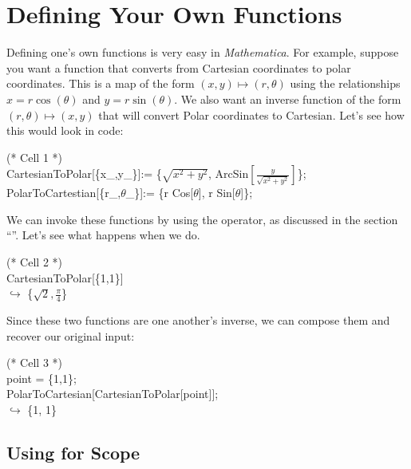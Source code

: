 \chapter{Defining Your Own Functions}
\label{chap:Functions}

Defining one's own functions is very easy in \emph{Mathematica}. For example, suppose you want a function that converts from Cartesian coordinates to polar coordinates. This is a map of the form $(x,y) \mapsto (r, \theta)$ using the relationships $x = r\cos(\theta)$ and $y = r\sin(\theta)$. We also want an inverse function of the form $(r, \theta) \mapsto (x,y)$ that will convert Polar coordinates to Cartesian. Let's see how this would look in code:

\begin{code}
	   (* Cell 1 *)\\
	   CartesianToPolar[\{x\_,y\_\}]:= \{$\sqrt{x^2 + y^2}$, ArcSin$\left[\frac{y}{\sqrt{x^2 + y^2}}\right]$\};\\
	   PolarToCartestian[\{r\_,$\theta$\_\}]:= \{r Cos[$\theta$], r Sin[$\theta$]\};\\
\end{code}

We can invoke these functions by using the \expr{[]} operator, as discussed in the section ``''. Let's see what happens when we do. 

\begin{code}
	   (* Cell 2 *)\\
	   CartesianToPolar[\{1,1\}]\\
	   $\hookrightarrow$ \{$\sqrt{2}, \frac{\pi}{4}$\}\\
\end{code}

Since these two functions are one another's inverse, we can compose them and recover our original input:

\begin{code}
	   (* Cell 3 *)\\
	   point = \{1,1\};\\
	   PolarToCartesian[CartesianToPolar[point]];\\
	   $\hookrightarrow$ \{1, 1\}\\
\end{code}


\section{Using  for Scope}


